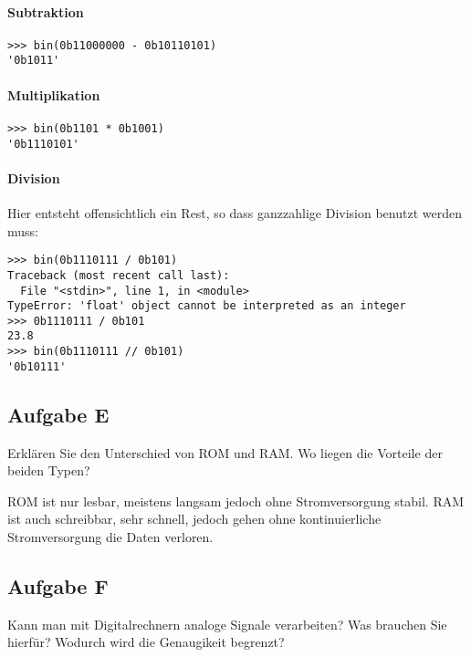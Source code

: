 \paragraph{Subtraktion}

\begin{verbatim}
>>> bin(0b11000000 - 0b10110101)
'0b1011'
\end{verbatim}

\paragraph{Multiplikation}

\begin{verbatim}
>>> bin(0b1101 * 0b1001)
'0b1110101'
\end{verbatim}

\paragraph{Division}

Hier entsteht offensichtlich ein Rest, so dass ganzzahlige Division benutzt
werden muss:

\begin{verbatim}
>>> bin(0b1110111 / 0b101)
Traceback (most recent call last):
  File "<stdin>", line 1, in <module>
TypeError: 'float' object cannot be interpreted as an integer
>>> 0b1110111 / 0b101
23.8
>>> bin(0b1110111 // 0b101)
'0b10111'
\end{verbatim}

\subsection{Aufgabe E}

\begin{problem}
	Erklären Sie den Unterschied von ROM und RAM. Wo liegen die Vorteile der
	beiden Typen?
\end{problem}

ROM ist nur lesbar, meistens langsam jedoch ohne Stromversorgung stabil. RAM
ist auch schreibbar, sehr schnell, jedoch gehen ohne kontinuierliche
Stromversorgung die Daten verloren.

\subsection{Aufgabe F}

\begin{problem}
	Kann man mit Digitalrechnern analoge Signale verarbeiten? Was brauchen Sie
	hierfür? Wodurch wird die Genaugikeit begrenzt?
\end{problem}


